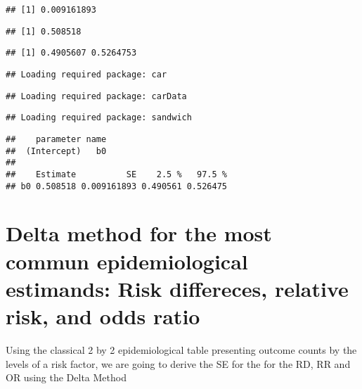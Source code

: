 \documentclass[]{article}
\begin{document}
\begin{verbatim}
## [1] 0.009161893
\end{verbatim}

\begin{verbatim}
## [1] 0.508518
\end{verbatim}

\begin{verbatim}
## [1] 0.4905607 0.5264753
\end{verbatim}

\begin{verbatim}
## Loading required package: car
\end{verbatim}

\begin{verbatim}
## Loading required package: carData
\end{verbatim}

\begin{verbatim}
## Loading required package: sandwich
\end{verbatim}

\begin{verbatim}
##    parameter name
##  (Intercept)   b0
## 
##    Estimate          SE    2.5 %   97.5 %
## b0 0.508518 0.009161893 0.490561 0.526475
\end{verbatim}

\hypertarget{delta-method-for-the-most-commun-epidemiological-estimands-risk-differeces-relative-risk-and-odds-ratio}{%
\section{Delta method for the most commun epidemiological estimands:
Risk differeces, relative risk, and odds
ratio}\label{delta-method-for-the-most-commun-epidemiological-estimands-risk-differeces-relative-risk-and-odds-ratio}}

Using the classical 2 by 2 epidemiological table presenting outcome
counts by the levels of a risk factor, we are going to derive the SE for
the for the RD, RR and OR using the Delta Method
\end{document}
